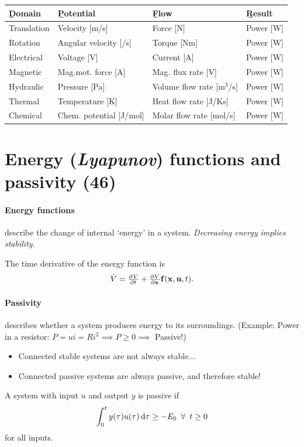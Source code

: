 \documentclass[a4paper, 12pt]{article}
\begin{document}
\begin{table}[H]
\small
\begin{tabular}{llll}
	\b{Domain}  & \b{Potential}           & \b{Flow}                                 & \b{Result} \\
	\hline
	Translation & Velocity [m/s]          & Force [N]                                & Power [W]  \\
	Rotation    & Angular velocity [/s]   & Torque [Nm]                              & Power [W]  \\
	Electrical  & Voltage [V]             & Current [A]                              & Power [W]  \\
	Magnetic    & Mag.mot. force [A]      & Mag. flux rate [V]                       & Power [W]  \\
	Hydraulic   & Pressure [Pa]           & Volume flow rate [m\(^3\)/s]             & Power [W]  \\
	Thermal     & Temperature [K]         & Heat flow rate [J/Ks]                    & Power [W]  \\
	Chemical    & Chem. potential [J/mol] & Molar flow rate [mol/s]                  & Power [W]
\end{tabular}
\end{table}

\section{Energy (\emph{Lyapunov}) functions and passivity (46)}
\paragraph{Energy functions} describe the change of internal `energy' in a system. \emph{Decreasing energy implies stability.}

The time derivative of the energy function is
\begin{equation}
	\dot{V} = \pd{V}{t} + \pd{V}{\V{x}} \V{f}(\V{x}, \V{u}, t).
\end{equation}

\paragraph{Passivity} describes whether a system produces energy to its surroundings.
(Example: Power in a resistor: \(P = u i = R i^2 \implies P \geq 0 \implies\) Passive!)
\begin{itemize}
	\item Connected stable systems are not always stable...
	\item Connected passive systems are always passive, and therefore stable!
\end{itemize}
A system with input \(u\) and output \(y\) is passive if
\begin{equation}
	\int_0^t y(\tau) u(\tau) \dif \tau \geq - E_0 \enforall t \geq 0
\end{equation}
for all inputs.
\end{document}
